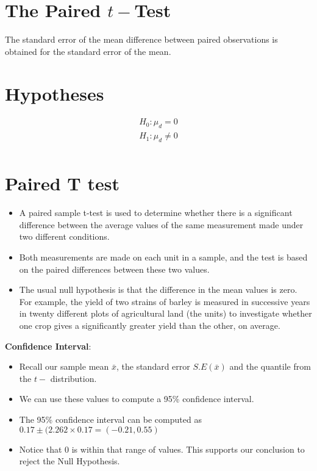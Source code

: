 \documentclass[]{report}
\begin{document}
\section{The Paired $t-$Test}



\begin{framed}
The standard error of the mean difference between paired
observations is obtained for the standard error of the mean.
\section{Hypotheses}
\begin{eqnarray*}
H_{0}: \mu_{d} = 0\\
H_{1}: \mu_{d} \neq 0\\
\end{eqnarray*}
\end{framed}



\section{Paired T test}
\begin{itemize} \item A paired sample t-test is used to determine whether there is a significant difference between the average values of the same measurement made under two different conditions. \item Both measurements are made on each unit in a sample, and the test is based on the paired differences between these two values. \item The usual null hypothesis is that the difference in the mean values is zero. For example, the yield of two strains of barley is measured in successive years in twenty different plots of agricultural land (the units) to investigate whether one crop gives a significantly greater yield than the other, on average.
\end{itemize}

\textbf{Confidence Interval}:
\begin{itemize}
\item Recall our sample mean $\bar{x}$, the standard error $S.E(\bar{x})$ and the quantile from the $t-$ distribution.
\item We can use these values to compute a 95\% confidence interval.
\item The 95\% confidence interval can be computed as $0.17 \pm (2.262 \times 0.17 = (-0.21,0.55)$
\item Notice that 0 is within that range of values. This supports our conclusion to reject the Null Hypothesis.
\end{itemize}
\end{document}
